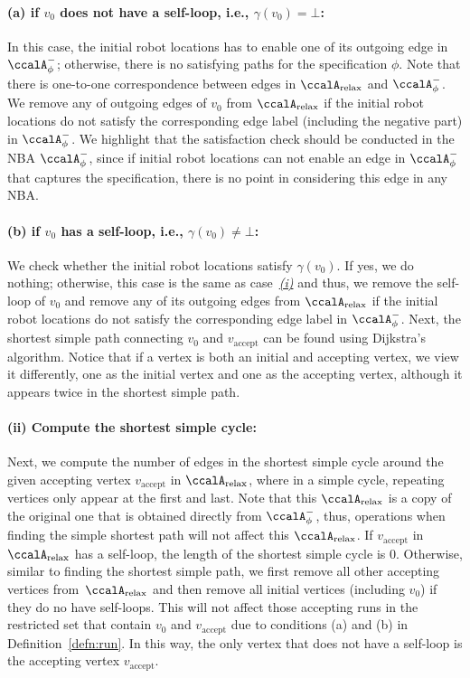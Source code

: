 \documentclass[Afour,sageh,times]{sagej}
\newcommand{\auto}[1]{\ccalA_{\text{#1}}}
\newcommand{\autop}{\ccalA_{\phi}}
\newcommand{\vertex}[1]{v_{\text{#1}}}
\begin{document}
{\paragraph{\quad (a) if $v_0$ does not have a self-loop, i.e., $\gamma(v_0)=\bot$:}\label{sec:initial} In this case,  the initial robot locations has to enable one of its outgoing edge in $\autop^-$; otherwise, there is no satisfying paths for the specification $\phi$. Note that there is one-to-one correspondence between edges in $\auto{relax}$ and $\autop^-$. We remove any of outgoing edges of $v_0$ from $\auto{relax}$ if the initial robot locations do not satisfy the corresponding edge label (including the negative part) in $\autop^-$. We highlight that the satisfaction check should be conducted in the NBA $\autop^-$, since if initial robot locations can not enable an edge in $\autop^-$ that captures the specification, there is no point in considering this edge in any NBA.
\paragraph{\quad (b) if $v_0$ has a self-loop, i.e., $\gamma(v_0)\neq\bot$:} We check whether the initial robot locations satisfy $\gamma(v_0)$. If yes, we do nothing; otherwise, this case is the  same as case~\hyperref[sec:initial]{\it (i)} and thus, we remove the self-loop of $v_0$ and
remove any of its  outgoing edges  from $\auto{relax}$ if the initial robot locations do not satisfy the corresponding edge label in $\autop^-$. Next, the shortest simple path connecting $v_0$ and $v_{\text{accept}}$ can be found using Dijkstra's algorithm.  Notice that if a vertex is both an initial and accepting vertex, we view it differently, one as the initial vertex and one as the accepting vertex, although it appears twice in the shortest simple path.
\paragraph{(ii) Compute the shortest simple cycle:} Next, we compute the number of edges in the shortest simple cycle around the given accepting vertex $v_\text{accept}$ in $\auto{relax}$, where in a simple cycle, repeating vertices only appear at the first and last. Note that this $\auto{relax}$ is a copy of the original one that is obtained directly from $\autop^-$, thus, operations when finding the simple shortest path will not affect this $\auto{relax}$. If $\vertex{accept}$ in $\auto{relax}$ has a self-loop, the length of the shortest simple cycle is 0. Otherwise, similar to finding the shortest simple path, we first remove all other accepting vertices from~$\auto{relax}$ and then remove all initial vertices (including $v_0$) if they do no have self-loops. This will not affect those accepting runs in the restricted set that contain $v_0$ and $v_{\text{accept}}$  due to conditions (a) and (b) in Definition~\ref{defn:run}.
  In this way, the only vertex that does not have a self-loop is the accepting vertex $v_{\text{accept}}$.

}
\end{document}
